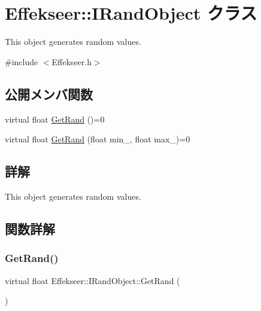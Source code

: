 \hypertarget{class_effekseer_1_1_i_rand_object}{}\section{Effekseer\+:\+:I\+Rand\+Object クラス}
\label{class_effekseer_1_1_i_rand_object}


This object generates random values.  




{\ttfamily \#include $<$Effekseer.\+h$>$}

\subsection*{公開メンバ関数}
\begin{DoxyCompactItemize}
\item 
virtual float \mbox{\hyperlink{class_effekseer_1_1_i_rand_object_aecc4fce270de1c127f19a53b1ca09454}{Get\+Rand}} ()=0
\item 
virtual float \mbox{\hyperlink{class_effekseer_1_1_i_rand_object_a2c7b39779f597094973517df4afa0b48}{Get\+Rand}} (float min\+\_\+, float max\+\_\+)=0
\end{DoxyCompactItemize}


\subsection{詳解}
This object generates random values. 

\subsection{関数詳解}
\mbox{\label{class_effekseer_1_1_i_rand_object_aecc4fce270de1c127f19a53b1ca09454}} 
\subsubsection{\texorpdfstring{Get\+Rand()}{GetRand()}\hspace{0.1cm}{\footnotesize\ttfamily [1/2]}}
{\footnotesize\ttfamily virtual float Effekseer\+::\+I\+Rand\+Object\+::\+Get\+Rand (\begin{DoxyParamCaption}{ }\end{DoxyParamCaption})\hspace{0.3cm}{\ttfamily [pure virtual]}}

